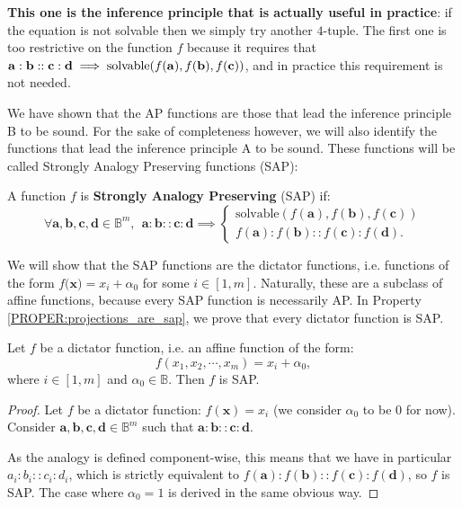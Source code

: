 \textbf{This one is the inference principle that is actually useful in
practice}: if the
equation is not solvable then we simply try another $4$-tuple. The first one is
too restrictive on the function $f$ because it requires that $\mathbf{a} :
\mathbf{b} :: \mathbf{c} : \mathbf{d} \implies  \text{solvable}(f(\mathbf{a}),
f(\mathbf{b}), f(\mathbf{c}))$, and in practice this requirement is not
needed.

We have shown that the AP functions are those that lead the inference
principle B to be sound.  For the sake of completeness however, we will also
identify the functions that lead the inference principle A to be sound. These
functions will be called Strongly Analogy Preserving functions (SAP):

\begin{definition}
  A function $f$ is \textbf{Strongly Analogy Preserving} (SAP) if:
  $$\forall \mathbf{a}, \mathbf{b}, \mathbf{c}, \mathbf{d} \in \mathbb{B}^m, ~~
  \mathbf{a}: \mathbf{b}:: \mathbf{c}: \mathbf{d} \implies
  \begin{cases}
    \text{solvable}(f(\mathbf{a}), f(\mathbf{b}), f(\mathbf{c}))\\
     f(\mathbf{a}) : f(\mathbf{b}) :: f(\mathbf{c}) : f(\mathbf{d}).
  \end{cases}$$
\end{definition}

We will show that the SAP functions are the dictator functions, i.e. functions
of the form $f(\mathbf{x)} = x_i + \alpha_0$ for some $i \in [1, m]$.
Naturally, these are a subclass of affine functions, because every SAP function
is necessarily AP. In Property \ref{PROPER:projections_are_sap}, we prove that
every dictator function  is SAP.

\begin{property}
  \label{PROPER:projections_are_sap}
  Let $f$ be a dictator function, i.e. an affine function of the form:
  $$f(x_1, x_2, \cdots, x_m) = x_i + \alpha_0,$$
  where $i \in [1, m]$ and $\alpha_0 \in \mathbb{B}$. Then $f$ is SAP.
\end{property}
\begin{proof}
  Let $f$ be a dictator function: $f(\mathbf{x}) = x_i$ (we consider $\alpha_0$
  to be $0$ for now). Consider $\mathbf{a}, \mathbf{b}, \mathbf{c}, \mathbf{d}
  \in \mathbb{B}^m$ such that $\mathbf{a}: \mathbf{b}:: \mathbf{c}:
  \mathbf{d}$.

  As the analogy is defined component-wise, this means that we have in
  particular $a_i : b_i :: c_i : d_i$, which is strictly equivalent to
  $f(\mathbf{a}) : f(\mathbf{b}) :: f(\mathbf{c}) : f(\mathbf{d})$, so $f$ is
  SAP. The case where $\alpha_0 = 1$ is derived in the same obvious way.
\end{proof}

